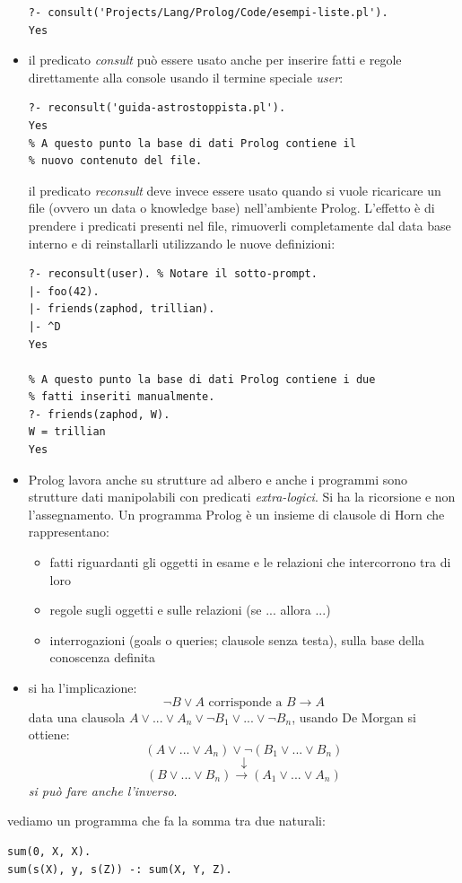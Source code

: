 \documentclass[a4paper,12pt, oneside]{book}
\begin{document}
\begin{itemize}
\begin{verbatim}
?- consult('Projects/Lang/Prolog/Code/esempi-liste.pl').
Yes
\end{verbatim}
\item il predicato \textit{consult} può essere usato anche per inserire fatti e regole direttamente alla console usando il termine speciale \textit{user}:
\begin{verbatim}
?- reconsult('guida-astrostoppista.pl').
Yes
% A questo punto la base di dati Prolog contiene il
% nuovo contenuto del file.
\end{verbatim}
il predicato \textit{reconsult} deve invece essere usato quando si vuole ricaricare un file (ovvero un data o knowledge base) nell'ambiente Prolog. L'effetto è di prendere i predicati presenti nel file, rimuoverli completamente dal data base interno e di reinstallarli utilizzando le nuove definizioni:
\begin{verbatim}
?- reconsult(user). % Notare il sotto-prompt.
|- foo(42).
|- friends(zaphod, trillian).
|- ^D
Yes

% A questo punto la base di dati Prolog contiene i due
% fatti inseriti manualmente.
?- friends(zaphod, W).
W = trillian
Yes
\end{verbatim}
\item Prolog lavora anche su strutture ad albero e anche i programmi sono strutture dati manipolabili con predicati \textit{extra-logici}. Si ha la ricorsione e non l'assegnamento. Un programma Prolog è un insieme di clausole di Horn che rappresentano:
\begin{itemize}
\item fatti riguardanti gli oggetti in esame e le relazioni che intercorrono tra di loro
\item regole sugli oggetti e sulle relazioni (se ... allora ...)
\item interrogazioni (goals o queries; clausole senza testa), sulla base della conoscenza definita
\end{itemize}
\item si ha l'implicazione: 
$$\neg B \vee A \mbox{ corrisponde a } B\to A$$
data una clausola $A\vee ... \vee A_n\vee \neg B_1\vee ... \vee\neg B_n$, usando De Morgan si ottiene:
$$(A\vee ... \vee A_n)\vee \neg (B_1\vee ... \vee B_n)$$
$$\downarrow$$
$$(B\vee ... \vee B_n)\to (A_1\vee ... \vee A_n)$$
\textit{si può fare anche l'inverso}.\\
\end{itemize}
vediamo un programma che fa la somma tra due naturali:
\begin{verbatim}
sum(0, X, X).
sum(s(X), y, s(Z)) -: sum(X, Y, Z).
\end{verbatim}
\end{document}
